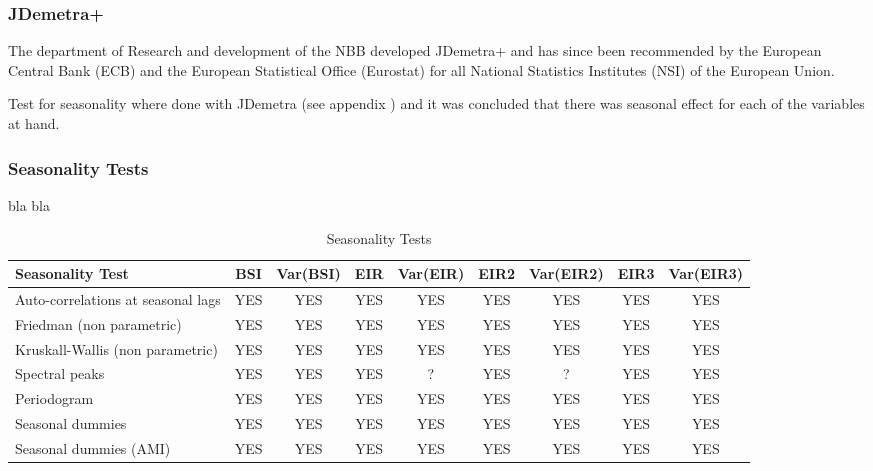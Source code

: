 \documentclass[12pt,a4paper,oneside]{book}
\begin{document}
\subsubsection{JDemetra+}


The department of Research and development of the NBB developed JDemetra+ and has since been recommended by the European Central Bank (ECB) and the European Statistical Office (Eurostat) for all National Statistics Institutes (NSI) of the European Union. 


Test for seasonality where done with JDemetra (see appendix ) and it was concluded that there was seasonal effect for each of the variables at hand.

\subsubsection{Seasonality Tests}

bla bla

\begin{table}[H]
    \centering \footnotesize
    \begin{tabular}{l|c|c|c|c|c|c|c|c}
\textbf{Seasonality Test} & BSI & Var(BSI) & EIR & Var(EIR) & EIR2 & Var(EIR2) & EIR3 & Var(EIR3) \\ \hline
Auto-correlations at seasonal lags& YES & YES & YES & YES & YES & YES & YES & YES \\
Friedman (non parametric)       & YES   & YES & YES & YES & YES & YES & YES & YES \\
Kruskall-Wallis (non parametric)& YES   & YES & YES & YES & YES & YES & YES & YES \\
Spectral peaks                  & YES   & YES & YES & ? & YES & ? & YES & YES \\
Periodogram                     & YES   & YES & YES & YES & YES & YES & YES & YES \\
Seasonal dummies                & YES   & YES & YES & YES & YES & YES & YES & YES \\
Seasonal dummies (AMI)          & YES   & YES & YES & YES & YES & YES & YES & YES \\
    \end{tabular}
    \caption{Seasonality Tests}
    \label{tab:Seasonality Tests}
\end{table}{}
\end{document}
